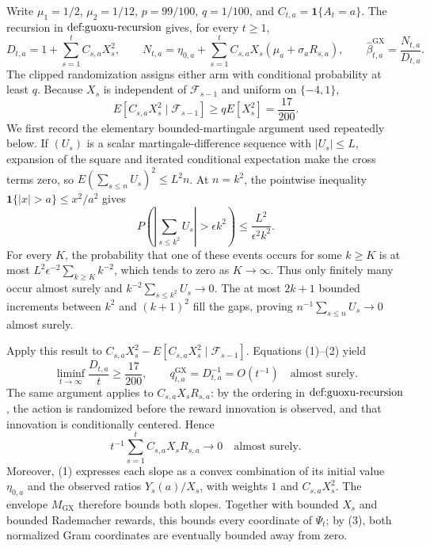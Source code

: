 Write \(\mu _1=1/2\), \(\mu _2=1/12\), \(p=99/100\), \(q=1/100\), and \(C_{t,a}=\mathbf 1\{A_t=a\}\).  The recursion in \(\textnormal{def:guoxu-recursion}\) gives, for every \(t\geq 1\),
\[
 D_{t,a}=1+\sum_{s=1}^t C_{s,a}X_s^2,\qquad
 N_{t,a}=\eta_{0,a}+\sum_{s=1}^t C_{s,a}X_s(\mu_a+\sigma_aR_{s,a}),\qquad
 \widehat\beta^{\mathrm{GX}}_{t,a}=\frac{N_{t,a}}{D_{t,a}}. \tag{1}
\]
The clipped randomization assigns either arm with conditional probability at least \(q\).  Because \(X_s\) is independent of \(\mathcal F_{s-1}\) and uniform on \(\{-4,1\}\),
\[
 E[C_{s,a}X_s^2\mid\mathcal F_{s-1}]
 \geq qE[X_s^2]=\frac{17}{200}. \tag{2}
\]
We first record the elementary bounded-martingale argument used repeatedly below.  If \((U_s)\) is a scalar martingale-difference sequence with \(|U_s|\leq L\), expansion of the square and iterated conditional expectation make the cross terms zero, so \(E(\sum_{s\leq n}U_s)^2\leq L^2n\).  At \(n=k^2\), the pointwise inequality \(\mathbf 1\{|x|>a\}\leq x^2/a^2\) gives
\[
 P\left(\left|\sum_{s\leq k^2}U_s\right|>\epsilon k^2\right)
 \leq \frac{L^2}{\epsilon^2k^2}.
\]
For every \(K\), the probability that one of these events occurs for some \(k\geq K\) is at most \(L^2\epsilon^{-2}\sum_{k\geq K}k^{-2}\), which tends to zero as \(K\to\infty\).  Thus only finitely many occur almost surely and \(k^{-2}\sum_{s\leq k^2}U_s\to0\).  The at most \(2k+1\) bounded increments between \(k^2\) and \((k+1)^2\) fill the gaps, proving \(n^{-1}\sum_{s\leq n}U_s\to0\) almost surely.

Apply this result to \(C_{s,a}X_s^2-E[C_{s,a}X_s^2\mid\mathcal F_{s-1}]\).  Equations (1)--(2) yield
\[
 \liminf_{t\to\infty}\frac{D_{t,a}}t\geq\frac{17}{200},
 \qquad q^{\mathrm{GX}}_{t,a}=D_{t,a}^{-1}=O(t^{-1})
 \quad\text{almost surely}. \tag{3}
\]
The same argument applies to \(C_{s,a}X_sR_{s,a}\): by the ordering in \(\textnormal{def:guoxu-recursion}\), the action is randomized before the reward innovation is observed, and that innovation is conditionally centered.  Hence
\[
 t^{-1}\sum_{s=1}^tC_{s,a}X_sR_{s,a}\longrightarrow0
 \quad\text{almost surely}. \tag{4}
\]
Moreover, (1) expresses each slope as a convex combination of its initial value \(\eta_{0,a}\) and the observed ratios \(Y_s(a)/X_s\), with weights \(1\) and \(C_{s,a}X_s^2\).  The envelope \(M_{\mathrm{GX}}\) therefore bounds both slopes.  Together with bounded \(X_s\) and bounded Rademacher rewards, this bounds every coordinate of \(\Psi_t\); by (3), both normalized Gram coordinates are eventually bounded away from zero.

